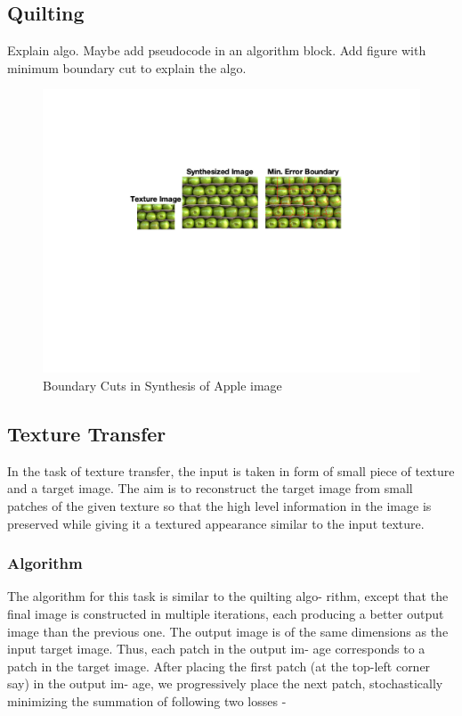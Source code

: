 \documentclass[10pt,twocolumn,letterpaper]{article}
\begin{document}
\subsection{Quilting}
Explain algo. Maybe add pseudocode in an algorithm block. Add figure with minimum boundary cut to explain the algo.
\begin{figure}[h]
\begin{center}
\includegraphics[trim={9cm 15cm 2cm 8cm},clip, scale=0.38]{resources/apple_boundary_example.png}
\end{center}
\vspace{-0.2em}
\caption{Boundary Cuts in Synthesis of Apple image}
\label{fig:bcut_example}
\end{figure}
\subsection{Texture Transfer}
In the task of texture transfer, the input is taken in form
of small piece of texture and a target image. The aim is to
reconstruct the target image from small patches of the given
texture so that the high level information in the image is
preserved while giving it a textured appearance similar to
the input texture.

\subsubsection{Algorithm}
The algorithm for this task is similar to the quilting algo-
rithm, except that the final image is constructed in multiple
iterations, each producing a better output image than the
previous one. The output image is of the same dimensions
as the input target image. Thus, each patch in the output im-
age corresponds to a patch in the target image. After placing
the first patch (at the top-left corner say) in the output im-
age, we progressively place the next patch, stochastically
minimizing the summation of following two losses -
\end{document}
